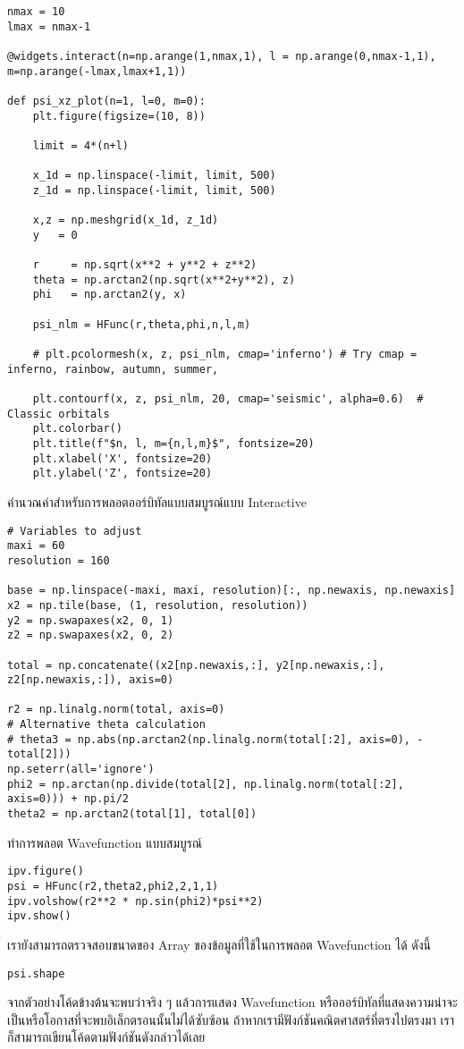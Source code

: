 \begin{lstlisting}[style=MyPython]
nmax = 10
lmax = nmax-1

@widgets.interact(n=np.arange(1,nmax,1), l = np.arange(0,nmax-1,1), m=np.arange(-lmax,lmax+1,1))

def psi_xz_plot(n=1, l=0, m=0):
    plt.figure(figsize=(10, 8))
    
    limit = 4*(n+l) 
    
    x_1d = np.linspace(-limit, limit, 500)
    z_1d = np.linspace(-limit, limit, 500)
    
    x,z = np.meshgrid(x_1d, z_1d)
    y   = 0
    
    r     = np.sqrt(x**2 + y**2 + z**2)
    theta = np.arctan2(np.sqrt(x**2+y**2), z)
    phi   = np.arctan2(y, x)

    psi_nlm = HFunc(r,theta,phi,n,l,m)
    
    # plt.pcolormesh(x, z, psi_nlm, cmap='inferno') # Try cmap = inferno, rainbow, autumn, summer, 
    
    plt.contourf(x, z, psi_nlm, 20, cmap='seismic', alpha=0.6)  # Classic orbitals
    plt.colorbar()
    plt.title(f"$n, l, m={n,l,m}$", fontsize=20)
    plt.xlabel('X', fontsize=20)
    plt.ylabel('Z', fontsize=20)
\end{lstlisting}

\noindent คำนวณค่าสำหรับการพลอตออร์บิทัลแบบสมบูรณ์แบบ Interactive

\begin{lstlisting}[style=MyPython]
# Variables to adjust
maxi = 60
resolution = 160

base = np.linspace(-maxi, maxi, resolution)[:, np.newaxis, np.newaxis]
x2 = np.tile(base, (1, resolution, resolution))
y2 = np.swapaxes(x2, 0, 1)
z2 = np.swapaxes(x2, 0, 2)

total = np.concatenate((x2[np.newaxis,:], y2[np.newaxis,:], z2[np.newaxis,:]), axis=0)

r2 = np.linalg.norm(total, axis=0)
# Alternative theta calculation
# theta3 = np.abs(np.arctan2(np.linalg.norm(total[:2], axis=0), -total[2]))
np.seterr(all='ignore')
phi2 = np.arctan(np.divide(total[2], np.linalg.norm(total[:2], axis=0))) + np.pi/2
theta2 = np.arctan2(total[1], total[0])
\end{lstlisting}

\noindent ทำการพลอต Wavefunction แบบสมบูรณ์

\begin{lstlisting}[style=MyPython]
ipv.figure()
psi = HFunc(r2,theta2,phi2,2,1,1)
ipv.volshow(r2**2 * np.sin(phi2)*psi**2)
ipv.show()
\end{lstlisting}

\noindent เรายังสามารถตรวจสอบขนาดของ Array ของข้อมูลที่ใช้ในการพลอต Wavefunction ได้ ดังนี้

\begin{lstlisting}[style=MyPython]
psi.shape
\end{lstlisting}

\bigskip

จากตัวอย่างโค้ดข้างต้นจะพบว่าจริง ๆ แล้วการแสดง Wavefunction หรือออร์บิทัลที่แสดงความน่าจะเป็นหรือโอกาสที่จะพบอิเล็กตรอนนั้นไม่ได้ซับซ้อน 
ถ้าหากเรามีฟังก์ชันคณิตศาสตร์ที่ตรงไปตรงมา เราก็สามารถเขียนโค้ดตามฟังก์ชันดังกล่าวได้เลย
